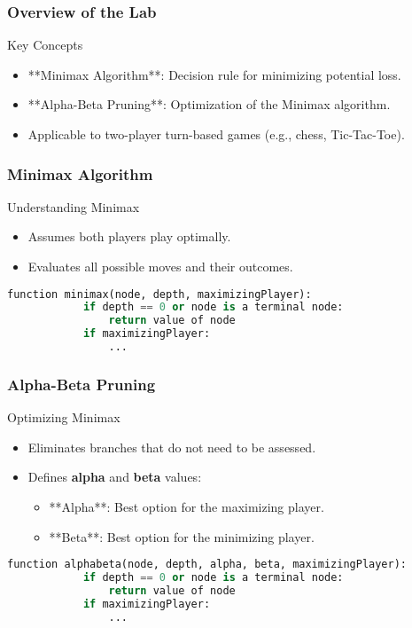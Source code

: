 \documentclass[aspectratio=169]{beamer}
\begin{document}
\begin{frame}[fragile]
    \frametitle{Overview of the Lab}
    \begin{block}{Key Concepts}
        \begin{itemize}
            \item **Minimax Algorithm**: Decision rule for minimizing potential loss.
            \item **Alpha-Beta Pruning**: Optimization of the Minimax algorithm.
        \end{itemize}
        \begin{itemize}
            \item Applicable to two-player turn-based games (e.g., chess, Tic-Tac-Toe).
        \end{itemize}
    \end{block}
\end{frame}

\begin{frame}[fragile]
    \frametitle{Minimax Algorithm}
    \begin{block}{Understanding Minimax}
        \begin{itemize}
            \item Assumes both players play optimally.
            \item Evaluates all possible moves and their outcomes.
        \end{itemize}
        \begin{lstlisting}[language=Python]
        function minimax(node, depth, maximizingPlayer):
            if depth == 0 or node is a terminal node:
                return value of node
            if maximizingPlayer:
                ...
        \end{lstlisting}
    \end{block}
\end{frame}

\begin{frame}[fragile]
    \frametitle{Alpha-Beta Pruning}
    \begin{block}{Optimizing Minimax}
        \begin{itemize}
            \item Eliminates branches that do not need to be assessed.
            \item Defines \textbf{alpha} and \textbf{beta} values:
            \begin{itemize}
                \item **Alpha**: Best option for the maximizing player.
                \item **Beta**: Best option for the minimizing player.
            \end{itemize}
        \end{itemize}
        \begin{lstlisting}[language=Python]
        function alphabeta(node, depth, alpha, beta, maximizingPlayer):
            if depth == 0 or node is a terminal node:
                return value of node
            if maximizingPlayer:
                ...
        \end{lstlisting}
    \end{block}
\end{frame}
\end{document}
